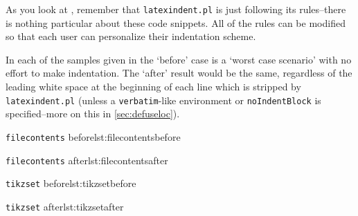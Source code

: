 \documentclass[11pt]{article}
\begin{document}
As you look at , remember
that \lstinline!latexindent.pl! is just following its rules--there is nothing
particular about these code snippets. All of the rules can be modified
so that each user can personalize their indentation scheme.

In each of the samples given in 
the `before' case is a `worst case scenario' with no effort to make indentation. The `after'
result would be the same, regardless of the leading white space at the beginning of
each line which is stripped by \lstinline!latexindent.pl! (unless a \lstinline!verbatim!-like
environment or \lstinline!noIndentBlock! is specified--more on this in \cref{sec:defuseloc}).

\begin{adjustwidth}{-2cm}{2cm}
    \noindent
	\begin{minipage}{.6\textwidth}
		\begin{cmhlistings}[style=demo]{\lstinline!filecontents! before}{lst:filecontentsbefore}
\begin{filecontents}{mybib.bib}
@online{strawberryperl,
title="Strawberry Perl",
url="http://strawberryperl.com/"}
@online{cmhblog,
title="A Perl script ...
url="...
\end{filecontents}
		\end{cmhlistings}
	\end{minipage}%
    \noindent
	\begin{minipage}{.6\textwidth}
		\begin{cmhlistings}[style=demo]{\lstinline!filecontents! after}{lst:filecontentsafter}
\begin{filecontents}{mybib.bib}
	@online{strawberryperl,
		title="Strawberry Perl",
		url="http://strawberryperl.com/"}
	@online{cmhblog,
		title="A Perl script for ...
		url="...
\end{filecontents}
		\end{cmhlistings}
	\end{minipage}
	\begin{minipage}{.6\textwidth}
		\begin{cmhlistings}[style=demo]{\lstinline!tikzset! before}{lst:tikzsetbefore}
		\end{cmhlistings}
	\end{minipage}%
	\begin{minipage}{.6\textwidth}
		\begin{cmhlistings}[style=demo]{\lstinline!tikzset! after}{lst:tikzsetafter}

\end{cmhlistings}
\end{minipage}
\end{adjustwidth}
\end{document}
